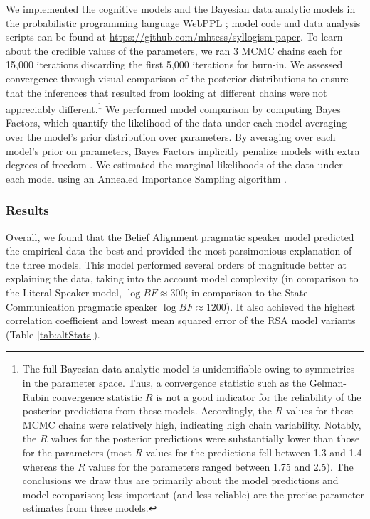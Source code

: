 \documentclass[floatsintext, man]{apa6}
\begin{document}
We implemented the cognitive models and the Bayesian data analytic models in the probabilistic programming language WebPPL \cite{dippl}; model code and data analysis scripts can be found at \url{https://github.com/mhtess/syllogism-paper}. 
To learn about the credible values of the parameters, we ran 3 MCMC chains each for 15,000 iterations discarding the first 5,000 iterations for burn-in. 
We assessed convergence through visual comparison of the posterior distributions to ensure that the inferences that resulted from looking at different chains were not appreciably different.\footnote{
The full Bayesian data analytic model is unidentifiable owing to symmetries in the parameter space. Thus, a convergence statistic 
such as the Gelman-Rubin convergence statistic $R$ \cite{gelman1992inference} is not a good indicator for the reliability of the posterior predictions from these models. Accordingly, the $R$ values for these MCMC chains were relatively high, indicating high chain variability. Notably, the $R$ values for the posterior predictions were substantially lower than those for the parameters (most $R$ values for the predictions fell between 1.3 and 1.4 whereas the $R$ values for the parameters ranged between 1.75 and 2.5). The conclusions we draw thus are primarily about the model predictions and model comparison; less important (and less reliable) are the precise parameter estimates from these models.
}
We performed model comparison by computing Bayes Factors, which quantify the likelihood of the data under each model averaging over the model's prior distribution over parameters. By averaging over each model's prior on parameters, Bayes Factors implicitly penalize models with extra degrees of freedom \cite{lee2014bayesian}.
We estimated the marginal likelihoods of the data under each model using an Annealed Importance Sampling algorithm \cite{neal2001annealed}.

\subsubsection{Results}

Overall, we found that the Belief Alignment pragmatic speaker model predicted the empirical data the best and provided the most parsimonious explanation of the three models.
This model performed several orders of magnitude better at explaining the data, taking into the account model complexity (in comparison to the Literal Speaker model, $\log BF \approx 300$; in comparison to the State Communication pragmatic speaker $\log BF \approx 1200$).
It also achieved the highest correlation coefficient and lowest mean squared error of the RSA model variants (Table \ref{tab:altStats}).
\end{document}
